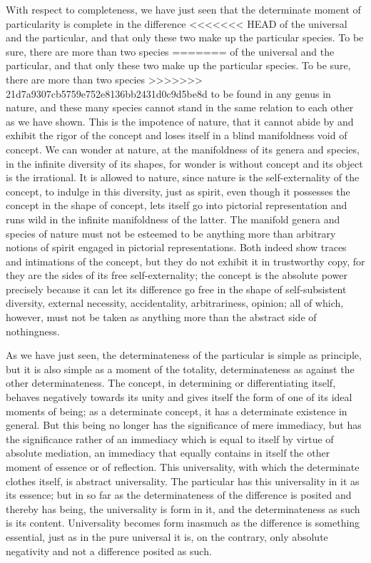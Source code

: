 With respect to completeness,
we have just seen that the determinate moment
of  particularity is complete in the difference
<<<<<<< HEAD
of the universal and the particular, 
and that only these two make up the particular species. 
To be sure, there are more than two species 
=======
of the universal and the particular,
and that only these two make up the particular species.
To be sure, there are more than two species
>>>>>>> 21d7a9307cb5759e752e8136bb2431d0c9d5be8d
to be found in any genus in nature,
and these many species cannot stand
in the same relation to each other
as we have shown.
This is the impotence of nature,
that it cannot abide by and exhibit the rigor of the concept
and loses itself in a blind manifoldness void of concept.
We can wonder at nature,
at the manifoldness of its genera and species,
in the infinite diversity of its shapes,
for wonder is without concept
and its object is the irrational.
It is allowed to nature,
since nature is the self-externality of the concept,
to indulge in this diversity,
just as spirit, even though it possesses
the concept in the shape of concept,
lets itself go into pictorial representation
and runs wild in the infinite manifoldness of the latter.
The manifold genera and species of nature must not be
esteemed to be anything more than arbitrary notions of spirit
engaged in pictorial representations.
Both indeed show traces and intimations of the concept,
but they do not exhibit it in trustworthy copy,
for they are the sides of its free self-externality;
the concept is the absolute power precisely
because it can let its difference go free
in the shape of self-subsistent diversity,
external necessity, accidentality, arbitrariness, opinion;
all of which, however, must not be taken as anything
more than the abstract side of nothingness.

As we have just seen, the determinateness of
the particular is simple as principle,
but it is also simple as a moment of the totality,
determinateness as against the other determinateness.
The concept, in determining or differentiating itself,
behaves negatively towards its unity
and gives itself the form of one
of its ideal moments of being;
as a determinate concept,
it has a determinate existence in general.
But this being no longer has
the significance of mere immediacy,
but has the significance rather of an immediacy
which is equal to itself by virtue of absolute mediation,
an immediacy that equally contains in itself
the other moment of essence or of reflection.
This universality, with which the determinate clothes itself,
is abstract universality.
The particular has this universality in it as its essence;
but in so far as the determinateness
of the difference is posited
and thereby has being,
the universality is form in it,
and the determinateness as such is its content.
Universality becomes form inasmuch as
the difference is something essential,
just as in the pure universal it is, on the contrary,
only absolute negativity
and not a difference posited as such.


